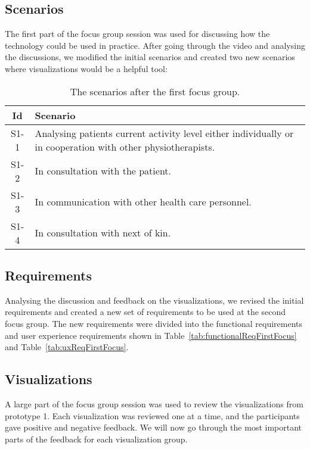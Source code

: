 \subsection{Scenarios}
The first part of the focus group session was used for discussing how the technology could be used in practice. After going through the video and analysing the discussions, we modified the initial scenarios and created two new scenarios where visualizations would be a helpful tool: 
\begin{table}[!h]
  \centering
  \begin{tabular}{|c|p{10cm}|}
    \hline
    \textbf{Id} & \textbf{Scenario} \\ \hline
    S1-1 & Analysing patients current activity level either individually or in cooperation with other physiotherapists. \\ \hline
    S1-2 & In consultation with the patient. \\ \hline
    S1-3 & In communication with other health care personnel. \\ \hline
    S1-4 & In consultation with next of kin. \\ \hline
  \end{tabular}
  \caption[Scenarios after Focus Group 1]{The scenarios after the first focus group.}
\end{table}

\subsection{Requirements}
Analysing the discussion and feedback on the visualizations, we revised the initial requirements and created a new set of requirements to be used at the second focus group. The new requirements were divided into the functional requirements and user experience requirements shown in Table~\ref{tab:functionalReqFirstFocus} and Table~\ref{tab:uxReqFirstFocus}. 


\subsection{Visualizations}
A large part of the focus group session was used to review the visualizations from prototype 1. Each visualization was reviewed one at a time, and the participants gave positive and negative feedback. We will now go through the most important parts of the feedback for each visualization group.

